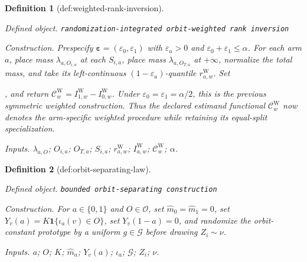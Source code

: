 \documentclass{article}
\newtheorem{definition}{Definition}
\begin{document}
\begin{definition}[def:weighted-rank-inversion]\label{def:weighted-rank-inversion}
\par\smallskip\noindent\emph{Defined object.} \texttt{randomization-\allowbreak{}integrated orbit-\allowbreak{}weighted rank inversion}
\par\smallskip\noindent\emph{Construction.} Prespecify \(\boldsymbol\varepsilon=(\varepsilon_0,\varepsilon_1)\) with \(\varepsilon_a>0\) and \(\varepsilon_0+\varepsilon_1\le\alpha\). For each arm \(a\), place mass \(\lambda_{a,O_{i,a}}\) at each \(S_{i,a}\), place mass \(\lambda_{a,O_{T,a}}\) at \(+\infty\), normalize the total mass, and take its left-continuous \((1-\varepsilon_a)\)-quantile \(r^{\mathrm W}_{a,w}\). Set \par\noindent {}\par\noindent, and return \(\mathcal C^{\mathrm W}_w=I^{\mathrm W}_{1,w}-I^{\mathrm W}_{0,w}\). Under \(\varepsilon_0=\varepsilon_1=\alpha/2\), this is the previous symmetric weighted construction. Thus the declared estimand functional \(\mathcal C^{\mathrm W}_w\) now denotes the arm-specific weighted procedure while retaining its equal-split specialization.
\par\smallskip\noindent\emph{Inputs.} \(\lambda_{a,O}\); \(O_{i,a}\); \(O_{T,a}\); \(S_{i,a}\); \(r^{\mathrm W}_{a,w}\); \(I^{\mathrm W}_{a,w}\); \(\mathcal C^{\mathrm W}_w\); \(\alpha\).
\end{definition}

\begin{definition}[def:orbit-separating-law]\label{def:orbit-separating-law}
\par\smallskip\noindent\emph{Defined object.} \texttt{bounded orbit-\allowbreak{}separating construction}
\par\smallskip\noindent\emph{Construction.} For \(a\in\{0,1\}\) and \(O\in\mathcal O\), set \(\widehat m_0=\widehat m_1=0\), set \(Y_v(a)=K\mathbf 1\{\iota_a(v)\in O\}\), set \(Y_v(1-a)=0\), and randomize the orbit-constant prototype by a uniform \(g\in\mathcal G\) before drawing \(Z_i\sim\nu\).
\par\smallskip\noindent\emph{Inputs.} \(a\); \(O\); \(K\); \(\widehat m_a\); \(Y_v(a)\); \(\iota_a\); \(\mathcal G\); \(Z_i\); \(\nu\).
\end{definition}
\end{document}
